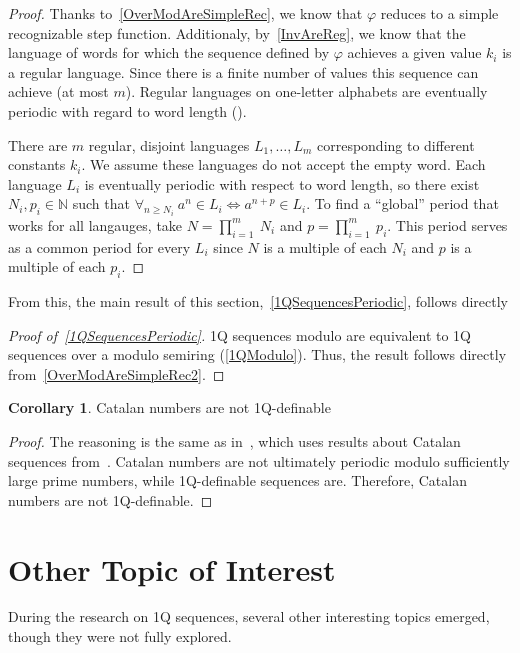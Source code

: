 \documentclass[12pt]{article}
\theoremstyle{definition}
\newtheorem{corollary}{Corollary}[section]
\begin{document}
\begin{proof}
    Thanks to~\cref{OverModAreSimpleRec}, we know that $\varphi$ reduces to a simple recognizable step function. Additionaly, by~\cref{InvAreReg}, we know that the language of words for which the sequence defined by $\varphi$ achieves a given value $k_i$ is a regular language. Since there is a finite number of values this sequence can achieve (at most $m$). Regular languages on one-letter alphabets are eventually periodic with regard to word length (\cite[Theorem 1]{PighizziniS02}).

    There are $m$ regular, disjoint languages $L_1, \ldots, L_m$ corresponding to different constants $k_i$. We assume these languages do not accept the empty word. Each language $L_i$ is eventually periodic with respect to word length, so there exist $N_i, p_i \in \mathbb{N}$ such that $\forall_{n \geq N_i} \ a^n \in L_i \iff a^{n + p} \in L_i$. To find a ``global'' period that works for all langauges, take $N = \prod_{i=1}^m \ N_i$ and $p = \prod_{i=1}^m \ p_i$. This period serves as a common period for every $L_i$ since $N$ is a multiple of each $N_i$ and $p$ is a multiple of each $p_i$.
\end{proof}

From this, the main result of this section,~\cref{1QSequencesPeriodic}, follows directly

\begin{proof}[Proof of~\cref{1QSequencesPeriodic}]
    1Q sequences modulo are equivalent to 1Q sequences over a modulo semiring (\cref{1QModulo}). Thus, the result follows directly from~\cref{OverModAreSimpleRec2}.
\end{proof}

\begin{corollary}
    Catalan numbers are not 1Q-definable
\end{corollary}

\begin{proof}
    The reasoning is the same as in~\cite[Theorem 7, Corollary 8]{CadilhacMPPS20}, which uses results about Catalan sequences from~\cite{KubotaCatalan}. Catalan numbers are not ultimately periodic modulo sufficiently large prime numbers, while 1Q-definable sequences are. Therefore, Catalan numbers are not 1Q-definable.
\end{proof}

\section{Other Topic of Interest}
During the research on 1Q sequences, several other interesting topics emerged, though they were not fully explored.
\end{document}
